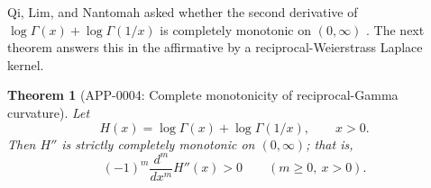 \documentclass[11pt]{article}
\numberwithin{equation}{section}
\newtheorem{theorem}{Theorem}[section]
\theoremstyle{definition}
\theoremstyle{remark}
\newcommand{\1}{\mathbf 1}
\begin{document}
Qi, Lim, and Nantomah asked whether the second derivative of \(\log\Gamma(x)+\log\Gamma(1/x)\) is completely monotonic on \((0,\infty)\) \cite{qi-lim-nantomah-polygamma}.  The next theorem answers this in the affirmative by a reciprocal-Weierstrass Laplace kernel.

\begin{theorem}[APP-0004: Complete monotonicity of reciprocal-Gamma curvature]
\label{thm:reciprocal-gamma-complete-monotonicity}
Let
\begin{equation}
\label{eq:reciprocal-gamma-h}
H(x)=\log\Gamma(x)+\log\Gamma(1/x),\qquad x>0.
\end{equation}
Then \(H''\) is strictly completely monotonic on \((0,\infty)\); that is,
\begin{equation}
\label{eq:reciprocal-gamma-complete-monotonicity}
(-1)^m\frac{d^m}{dx^m}H''(x)>0
\qquad(m\ge0,\ x>0).
\end{equation}
\end{theorem}
\end{document}
